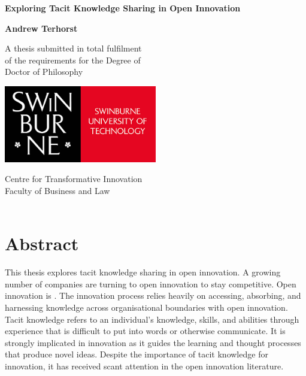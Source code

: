 \documentclass[12pt,table,xcdraw]{book}
\renewcommand{\today}{\the\day \ \monthname \ \the\year}
\begin{document}
\frontmatter

\begin{titlepage}
\renewcommand{\today}{\monthname \ \the\year}
\begin{center}
\vspace*{1cm}

\Huge
\textbf{Exploring Tacit Knowledge Sharing in Open Innovation}\\
\vspace{1cm}

\Large
\textbf{Andrew Terhorst}
\vfill

\Large
A thesis submitted in total fulfilment\\
of the requirements for the Degree of \\
Doctor of Philosophy

\vspace{1cm}

\includegraphics[width=0.5\textwidth]{Images/swinburne_university_of_technology.png} 

\vspace{1cm}

\Large
Centre for Transformative Innovation\\
Faculty of Business and Law\\
\today
\end{center}
\end{titlepage}

\doublespacing

\chapter*{Abstract}

This thesis explores tacit knowledge sharing in open innovation. A growing number of companies are turning to open innovation to stay competitive. Open innovation is  \citep[][pg.~17]{chesbrough2014explicating}. The innovation process relies heavily on accessing, absorbing, and harnessing knowledge across organisational boundaries with open innovation. Tacit knowledge refers to an individual's knowledge, skills, and abilities through experience that is difficult to put into words or otherwise communicate. It is strongly implicated in innovation as it guides the learning and thought processes that produce novel ideas. Despite the importance of tacit knowledge for innovation, it has received scant attention in the open innovation literature. \medskip
\end{document}
